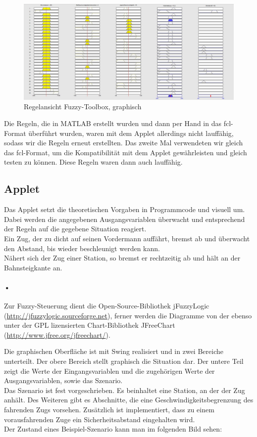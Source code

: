 \documentclass[10pt,a4paper]{article}
\begin{document}
\begin{figure}[htb]
\leavevmode
\includegraphics[width=\textwidth]{matlab_regeln_graphisch}
\caption[Ansicht Regeln (graphisch)]{Regelansicht Fuzzy-Toolbox, graphisch}
\label{matlab_regeln_graphisch}
\end{figure}

Die Regeln, die in MATLAB erstellt wurden und dann per Hand in das fcl-Format überführt wurden, waren mit dem Applet allerdings nicht lauffähig, sodass wir die Regeln erneut erstellten. Das zweite Mal verwendeten wir gleich das fcl-Format, um die Kompatibilität mit dem Applet gewährleisten und gleich testen zu können. Diese Regeln waren dann auch lauffähig.

\subsection{Applet}
Das Applet setzt die theoretischen Vorgaben in Programmcode und visuell um. Dabei werden die angegebenen Ausgangsvariablen überwacht und entsprechend der Regeln auf die gegebene Situation reagiert. \\
Ein Zug, der zu dicht auf seinen Vordermann auffährt, bremst ab und überwacht den Abstand, bis wieder beschleunigt werden kann. \\
Nähert sich der Zug einer Station, so bremst er rechtzeitig ab und hält an der Bahnsteigkante an.

\paragraph*{•}
Zur Fuzzy-Steuerung dient die Open-Source-Bibliothek jFuzzyLogic (\url{http://jfuzzylogic.sourceforge.net}), ferner werden die Diagramme von der ebenso unter der GPL lizensierten Chart-Bibliothek JFreeChart (\url{http://www.jfree.org/jfreechart/}).

Die graphischen Oberfläche ist mit Swing realisiert und in zwei Bereiche unterteilt. Der obere Bereich stellt graphisch die Situation dar. Der untere Teil zeigt die Werte der Eingangsvariablen und die zugehörigen Werte der Ausgangsvariablen, sowie das Szenario.\\
Das Szenario ist fest vorgeschrieben. Es beinhaltet eine Station, an der der Zug anhält. Des Weiteren gibt es Abschnitte, die eine Geschwindigkeitsbegrenzung des fahrenden Zugs vorsehen. Zusätzlich ist implementiert, dass zu einem vorausfahrenden Zuge ein Sicherheitsabstand eingehalten wird. \\
Der Zustand eines Beispiel-Szenario kann man im folgenden Bild sehen:
\end{document}

